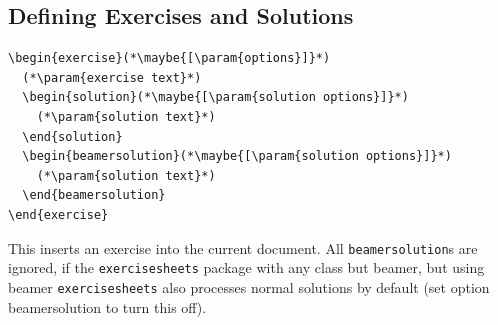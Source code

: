 \documentclass[DIV12,BCOR0mm]{scrartcl}
\newcommand{\exsh}{\texttt{exercisesheets}\xspace}
\newcommand{\param}[1]{$\langle${\normalfont\itshape #1\/}$\rangle$}
\newcommand{\maybe}[1]{\textcolor{green!50!black}{#1}}
\newcommand{\optionstyle}{\normalfont\ttfamily\color{red!50!black}}
\newcommand{\option}[1]{{\optionstyle #1}}
\begin{document}
\subsection{Defining Exercises and Solutions}
\label{sec:exercises-solutions}
\begin{lstlisting}
\begin{exercise}(*\maybe{[\param{options}]}*)
  (*\param{exercise text}*)
  \begin{solution}(*\maybe{[\param{solution options}]}*)
    (*\param{solution text}*)
  \end{solution}
  \begin{beamersolution}(*\maybe{[\param{solution options}]}*)
    (*\param{solution text}*)
  \end{beamersolution}
\end{exercise}
\end{lstlisting}

This inserts an exercise into the current document. All
\lstinline|beamersolution|s are ignored, if the
\exsh package with any class but beamer, but using beamer
\exsh also processes
normal solutions by default (set option \option{beamersolution}
to turn this off).
\end{document}
